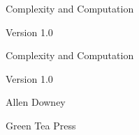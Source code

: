 \documentclass[10pt]{book}
\newcommand{\thetitle}{Complexity and Computation}
\newcommand{\theversion}{1.0}
\begin{document}
\frontmatter




\newtheorem{ex}{Exercise}[chapter]

\begin{latexonly}

\renewcommand{\blankpage}{\thispagestyle{empty} \quad \newpage}



\thispagestyle{empty}

\begin{flushright}
\vspace*{2.0in}

\begin{spacing}{3}
{\huge \thetitle}
\end{spacing}

\vspace{0.25in}

Version \theversion

\vfill

\end{flushright}


\blankpage
\blankpage

\pagebreak
\thispagestyle{empty}

\begin{flushright}
\vspace*{2.0in}

\begin{spacing}{3}
{\huge \thetitle}
\end{spacing}

\vspace{0.25in}

Version \theversion

\vspace{1in}


{\Large
Allen Downey\\
}


\vspace{0.5in}

{\Large Green Tea Press}


\end{flushright}
\end{latexonly}
\end{document}
